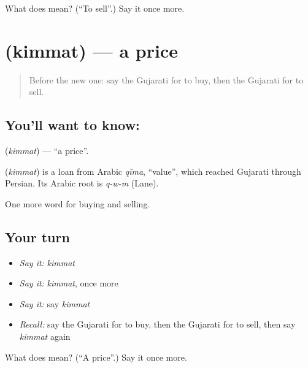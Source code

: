 \begin{tcolorbox}[breakable,colback=teal!4,colframe=teal!35!black,title={Before you move on}]
What does  mean? (\textquotedblleft{}To sell\textquotedblright{}.) Say it once more.
\end{tcolorbox}
\section[\texorpdfstring{\gu{કિંમત} (kimmat)}{કિંમત (kimmat)}]{ (kimmat) — a price}

\label{lesson:GU-C57-price}



\begin{quote}
Before the new one: say the Gujarati for to buy, then the Gujarati for to sell.
\end{quote}

\subsection*{You'll want to know: }
\textbf{} (\emph{kimmat}) — \textquotedblleft{}a price\textquotedblright{}.

\begin{cousinweb}
\textbf{} (\emph{kimmat}) is a loan from Arabic \emph{qīma}, \textquotedblleft{}value\textquotedblright{}, which reached Gujarati through Persian. Its Arabic root is \emph{q-w-m} (Lane).
\end{cousinweb}

\begin{grammarlens}[title={What you've built}]
One more word for buying and selling.
\end{grammarlens}

\subsection*{Your turn}
\begin{itemize}
\raggedright
  \item \emph{Say it:} \emph{kimmat}
  \item \emph{Say it:} \emph{kimmat}, once more
  \item \emph{Say it:} say \emph{kimmat}
  \item \emph{Recall:} say the Gujarati for to buy, then the Gujarati for to sell, then say \emph{kimmat} again
\end{itemize}

\begin{tcolorbox}[breakable,colback=teal!4,colframe=teal!35!black,title={Before you move on}]
What does  mean? (\textquotedblleft{}A price\textquotedblright{}.) Say it once more.
\end{tcolorbox}
